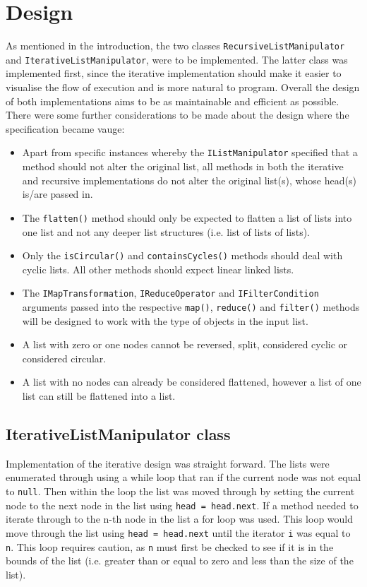 \documentclass{article}
\begin{document}
\section{Design}
As mentioned in the introduction, the two classes \verb+RecursiveListManipulator+ and \verb+IterativeListManipulator+, were to be implemented. The latter class was implemented first, since the iterative implementation should make it easier to visualise the flow of execution and is more natural to program. Overall the design of both implementations aims to be as maintainable and efficient as possible. There were some further considerations to be made about the design where the specification became vauge:

\begin{itemize}
\item Apart from specific instances whereby the \verb+IListManipulator+ specified that a method should not alter the original list, all methods in both the iterative and recursive implementations do not alter the original list(s), whose head(s) is/are passed in.
\item The \verb+flatten()+ method should only be expected to flatten a list of lists into one list and not any deeper list structures (i.e. list of lists of lists).
\item Only the \verb+isCircular()+ and \verb+containsCycles()+ methods should deal with cyclic lists. All other methods should expect linear linked lists.
\item The \verb+IMapTransformation+, \verb+IReduceOperator+ and \verb+IFilterCondition+ arguments passed into the respective \verb+map()+, \verb+reduce()+ and \verb+filter()+ methods will be designed to work with the type of objects in the input list.
\item A list with zero or one nodes cannot be reversed, split, considered cyclic or considered circular.
\item A list with no nodes can already be considered flattened, however a list of one list can still be flattened into a list.
\end{itemize}

\subsection{IterativeListManipulator class}
Implementation of the iterative design was straight forward. The lists were enumerated through using a while loop that ran if the current node was not equal to \verb+null+. Then within the loop the list was moved through by setting the current node to the next node in the list using \verb+head = head.next+. If a method needed to iterate through to the n-th node in the list a for loop was used. This loop would move through the list using \verb+head = head.next+ until the iterator \verb+i+ was equal to \verb+n+. This loop requires caution, as \verb+n+ must first be checked to see if it is in the bounds of the list (i.e. greater than or equal to zero and less than the size of the list). \\
\end{document}
